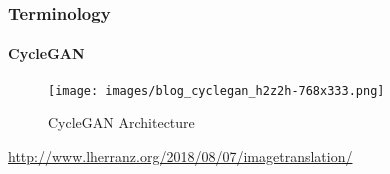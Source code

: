 \documentclass[aspectratio=169, lecture, amberg]{OTHAWbeamer}
\begin{document}
\begin{comment}
\begin{frame}
    \frametitle{Terminology}
    \framesubtitle{Generative Adversarial Networks(GAN)}
    \begin{block}{Generator loss}
        \begin{equation}
            \min_G \mathcal{L}_G = \mathbb{E}_{z \sim p_z(z)} [\log(1 - D(G(z)))]
        \end{equation}
    \end{block}
    \begin{block}{Discriminator loss}
        \begin{equation}
            \max_D \mathcal{L}_D = \mathbb{E}_{x \sim p_{\text{data}}(x)} [\log D(x)] + \mathbb{E}_{z \sim p_z(z)} [\log(1 - D(G(z)))]
        \end{equation}
    \end{block}
    \tiny\footnotemark \url{Goodfellow, I., Pouget-Abadie, J., Mirza, M., Xu, B., Warde-Farley, D., Ozair,
    S., Courville, A., Bengio, Y.: Generative adversarial nets. In: Neural Information
    Processing Systems (NeurIPS) (2014)}
\end{frame}
\end{comment}
\begin{frame}
\frametitle{Terminology}
\framesubtitle{CycleGAN}
\begin{figure}
    \centering
    \texttt{[image: images/blog\_cyclegan\_h2z2h-768x333.png]}
    \caption{CycleGAN Architecture}
\end{figure}
\tiny{\footnotemark \url{http://www.lherranz.org/2018/08/07/imagetranslation/}}
\end{frame}
\end{document}
